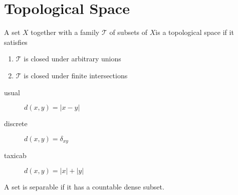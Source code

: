 \section{Topological Space}
	\begin{definition}
		A set $X$ together with a family $\mathcal{T}$ of subsets of $X$is a topological space if it satisfies
		\begin{enumerate}
			\item $\mathcal{T}$ is closed under arbitrary unions
			\item $\mathcal{T}$ is closed under finite intersections
		\end{enumerate}
	\end{definition}
	\begin{description}
		\item[usual] $d(x,y) = |x-y|$
		\item[discrete] $d(x,y) = \delta_{xy}$
		\item[taxicab] $d(x,y) = |x| + |y|$
	\end{description}
	\begin{definition}
		A set is separable if it has a countable dense subset. 
	\end{definition}
